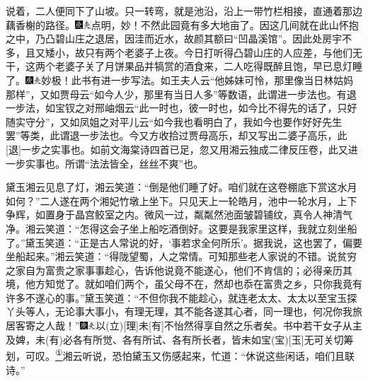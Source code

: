 说着，二人便同下了山坡。只一转弯，就是池沿，沿上一带竹栏相接，直通着那边藕香榭的路径。{\includegraphics[width=3mm]{../Images/00004}\includegraphics[width=3mm]{../Images/00012}\footnotesize \kaishu 点明，妙！不然此园竟有多大地亩了。}因这几间就在此山怀抱之中，乃凸碧山庄之退居，因洼而近水，故颜其额曰``凹晶溪馆''。因此处房宇不多，且又矮小，故只有两个老婆子上夜。今日打听得凸碧山庄的人应差，与他们无干，这两个老婆子关了月饼果品并犒赏的酒食来，二人吃得既醉且饱，早已息灯睡了。{\includegraphics[width=3mm]{../Images/00004}\includegraphics[width=3mm]{../Images/00012}\footnotesize \kaishu 妙极！此书有进一步写法。如王夫人云``他姊妹可怜，那里像当日林姑妈那样''，又如贾母云``如今人少，那里有当日人多''等数语，此谓进一步法也。有退一步法，如宝钗之对邢岫烟云``此一时也，彼一时也，如今比不得先的话了，只好随实守分''，又如凤姐之对平儿云``如今我也看明白了，我如今也要作好好先生罢''等类，此谓退一步法也。今又方收拾过贾母高乐，却又写出二婆子高乐，此{[}退{]}一步之实事也。如前文海棠诗四首已足，忽又用湘云独成二律反压卷，此又进一步实事也。所谓``法法皆全，丝丝不爽''也。}

黛玉湘云见息了灯，湘云笑道：``倒是他们睡了好。咱们就在这卷棚底下赏这水月如何？''二人遂在两个湘妃竹墩上坐下。只见天上一轮皓月，池中一轮水月，上下争辉，如置身于晶宫鲛室之内。微风一过，粼粼然池面皱碧铺纹，真令人神清气净。湘云笑道：``怎得这会子坐上船吃酒倒好。这要是我家里这样，我就立刻坐船了。''黛玉笑道：``正是古人常说的好，`事若求全何所乐'。据我说，这也罢了，偏要坐船起来。''湘云笑道：``得陇望蜀，人之常情。可知那些老人家说的不错。说贫穷之家自为富贵之家事事趁心，告诉他说竟不能遂心，他们不肯信的；必得亲历其境，他方知觉了。就如咱们两个，虽父母不在，然却也忝在富贵之乡，只你我竟有许多不遂心的事。''黛玉笑道：``不但你我不能趁心，就连老太太、太太以至宝玉探丫头等人，无论事大事小，有理无理，其不能各遂其心者，同一理也，何况你我旅居客寄之人哉！''{\includegraphics[width=3mm]{../Images/00004}\includegraphics[width=3mm]{../Images/00012}\footnotesize \kaishu 以{(立)}{[}理{]}未{[}有{]}不怡然得享自然之乐者矣。书中若干女子从主及婢，未{(有)}必各有所觉、各有所试、各有所长者，皆未如宝{(宝)}{[}玉{]}无可关切筹划，可叹。}\href{../Text/part0080_split_000.html\#lnkback_1_a}{\textsuperscript{①}}湘云听说，恐怕黛玉又伤感起来，忙道：``休说这些闲话，咱们且联诗。''

